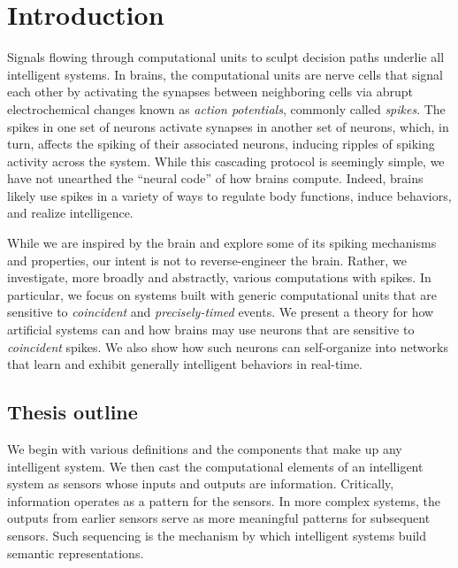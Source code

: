 \section{Introduction}

Signals flowing through computational units to sculpt decision paths underlie all intelligent systems.
In brains, the computational units are nerve cells that signal each other by activating the synapses between neighboring cells via abrupt electrochemical changes known as \emph{action potentials}, commonly called \emph{spikes}.
The spikes in one set of neurons activate synapses in another set of neurons, which, in turn, affects the spiking of their associated neurons, inducing ripples of spiking activity across the system.
While this cascading protocol is seemingly simple, we have not unearthed the ``neural code'' of how brains compute.
Indeed, brains likely use spikes in a variety of ways to regulate body functions, induce behaviors, and realize intelligence.

While we are inspired by the brain and explore some of its spiking mechanisms and properties, our intent is not to reverse-engineer the brain.
Rather, we investigate, more broadly and abstractly, various computations with spikes.
In particular, we focus on systems built with generic computational units that are sensitive to \emph{coincident} and \emph{precisely-timed} events.
We present a theory for how artificial systems can and how brains may use neurons that are sensitive to \emph{coincident} spikes.
We also show how such neurons can self-organize into networks that learn and exhibit generally intelligent behaviors in real-time.

\subsection{Thesis outline}

We begin with various definitions and the components that make up any intelligent system.
We then cast the computational elements of an intelligent system as sensors whose inputs and outputs are information.
Critically, information operates as a pattern for the sensors.
In more complex systems, the outputs from earlier sensors serve as more meaningful patterns for subsequent sensors.
Such sequencing is the mechanism by which intelligent systems build semantic representations.

